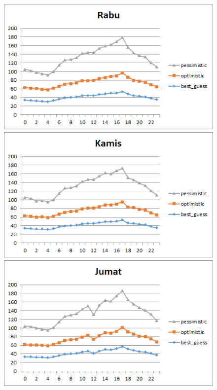 			\begin{figure}[H]
				\centering		
				\includegraphics[]{Gambar/rabusampel108052017.png}
				\includegraphics[]{Gambar/kamissampel108052017.png}
				\includegraphics[]{Gambar/jumatsampel108052017.png}
			\end{figure}	
			
